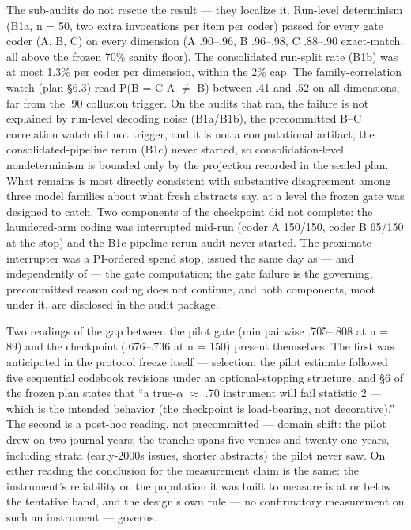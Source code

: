 The sub-audits do not rescue the result --- they localize it. Run-level determinism (B1a, n = 50, two extra invocations per item per coder) passed for every gate coder (A, B, C) on every dimension (A .90--.96, B .96--.98, C .88--.90 exact-match, all above the frozen 70\% sanity floor). The consolidated run-split rate (B1b) was at most 1.3\% per coder per dimension, within the 2\% cap. The family-correlation watch (plan \S{}6.3) read P(B = C \textbar{} A $\ne$ B) between .41 and .52 on all dimensions, far from the .90 collusion trigger. On the audits that ran, the failure is not explained by run-level decoding noise (B1a/B1b), the precommitted B--C correlation watch did not trigger, and it is not a computational artifact; the consolidated-pipeline rerun (B1c) never started, so consolidation-level nondeterminism is bounded only by the projection recorded in the sealed plan. What remains is most directly consistent with substantive disagreement among three model families about what fresh abstracts say, at a level the frozen gate was designed to catch. Two components of the checkpoint did not complete: the laundered-arm coding was interrupted mid-run (coder A 150/150, coder B 65/150 at the stop) and the B1c pipeline-rerun audit never started. The proximate interrupter was a PI-ordered spend stop, issued the same day as --- and independently of --- the gate computation; the gate failure is the governing, precommitted reason coding does not continue, and both components, moot under it, are disclosed in the audit package.

Two readings of the gap between the pilot gate (min pairwise .705--.808 at n = 89) and the checkpoint (.676--.736 at n = 150) present themselves. The first was anticipated in the protocol freeze itself --- selection: the pilot estimate followed five sequential codebook revisions under an optional-stopping structure, and \S{}6 of the frozen plan states that ``a true-$\alpha$ $\approx$ .70 instrument will fail statistic 2 --- which is the intended behavior (the checkpoint is load-bearing, not decorative).'' The second is a post-hoc reading, not precommitted --- domain shift: the pilot drew on two journal-years; the tranche spans five venues and twenty-one years, including strata (early-2000s issues, shorter abstracts) the pilot never saw. On either reading the conclusion for the measurement claim is the same: the instrument's reliability on the population it was built to measure is at or below the tentative band, and the design's own rule --- no confirmatory measurement on such an instrument --- governs.

